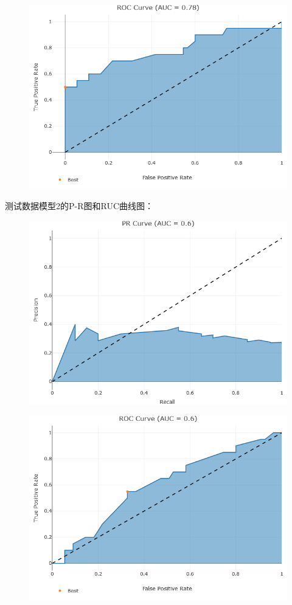 \documentclass[12pt,a4paper]{article}
\begin{document}
    \begin{figure}[H]
        \centering
        \includegraphics[scale=0.65]{TestROC1.png}
    \end{figure}
    测试数据模型2的P-R图和RUC曲线图：
    \begin{figure}[H]
        \centering
        \includegraphics[scale=0.65]{TestPR2.png}
    \end{figure}
    \begin{figure}[H]
        \centering
        \includegraphics[scale=0.65]{TestROC2.png}
    \end{figure}
\end{document}
